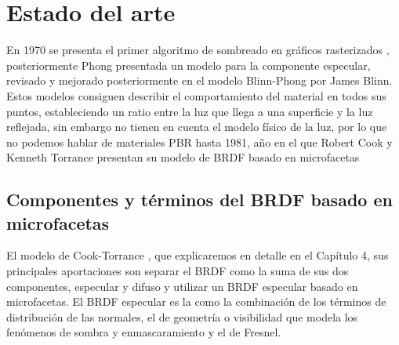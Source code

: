 \chapter{Estado del arte}

En 1970 se presenta el primer algoritmo de sombreado en gr\'aficos rasterizados \autocite{gouraud}, posteriormente 
Phong \autocite{phong} presentada un modelo para la componente especular, revisado y mejorado posteriormente en el modelo Blinn-Phong
\autocite{blinnphong} por James Blinn. Estos modelos consiguen describir el comportamiento del material en todos sus puntos,
estableciendo un ratio entre la luz que llega a una superficie y la luz reflejada, sin embargo no tienen en cuenta el modelo f\'isico de
la luz, por lo que no podemos hablar de materiales PBR hasta 1981, a\~no en el que Robert Cook y Kenneth Torrance presentan su modelo
de BRDF basado en microfacetas \autocite{cooktorrance}

\section{Componentes y t\'erminos del BRDF basado en microfacetas}

El modelo de Cook-Torrance \autocite{cooktorrance}, que explicaremos en detalle en el Cap\'itulo 4, sus principales aportaciones son
separar el BRDF como la suma de sus dos componentes, especular y difuso y utilizar un BRDF especular basado en microfacetas. El BRDF
especular es la como la combinaci\'on de los t\'erminos de distribuci\'on de las normales, el de geometr\'ia o visibilidad que modela
los fen\'omenos de sombra y enmascaramiento y el de Fresnel.

